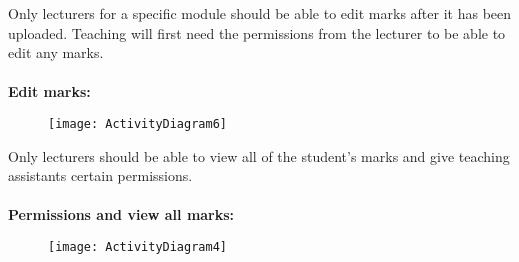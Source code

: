 \documentclass[12pt,a4paper]{article}
\begin{document}
\newpage
Only lecturers for a specific module should be able to edit marks after it has been uploaded.  Teaching will first need the permissions from the lecturer to be able to edit any marks.\\
\\
\textbf {Edit marks:}
\begin{figure}[h]
\begin{center}
\texttt{[image: ActivityDiagram6]}
\end{center}
\end{figure}

\newpage
Only lecturers should be able to view all of the student's marks and give teaching assistants certain permissions.\\
\\
\textbf {Permissions and view all marks:}
\begin{figure}[h]
\begin{center}
\texttt{[image: ActivityDiagram4]}
\end{center}
\end{figure}
\end{document}
